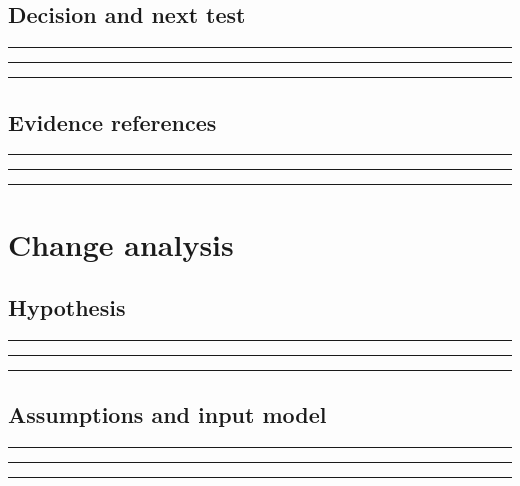 \documentclass[11pt]{article}
\begin{document}
\subsection{Decision and next test}
\noindent\rule{\linewidth}{0.35pt}\par\vspace{0.22in}
\noindent\rule{\linewidth}{0.35pt}\par\vspace{0.22in}
\noindent\rule{\linewidth}{0.35pt}\par\vspace{0.18in}

\subsection{Evidence references}
\noindent\rule{\linewidth}{0.35pt}\par\vspace{0.22in}
\noindent\rule{\linewidth}{0.35pt}\par\vspace{0.22in}
\noindent\rule{\linewidth}{0.35pt}\par\vspace{0.18in}
\clearpage

\section{Change analysis}

\subsection{Hypothesis}
\noindent\rule{\linewidth}{0.35pt}\par\vspace{0.22in}
\noindent\rule{\linewidth}{0.35pt}\par\vspace{0.22in}
\noindent\rule{\linewidth}{0.35pt}\par\vspace{0.18in}

\subsection{Assumptions and input model}
\noindent\rule{\linewidth}{0.35pt}\par\vspace{0.22in}
\noindent\rule{\linewidth}{0.35pt}\par\vspace{0.22in}
\noindent\rule{\linewidth}{0.35pt}\par\vspace{0.18in}
\end{document}
